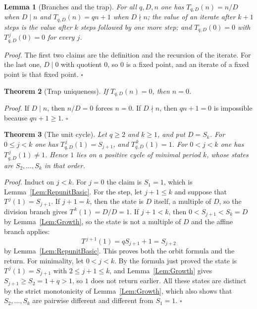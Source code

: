 \documentclass[11pt,letterpaper]{article}
\newtheorem{theorem}{Theorem}
\newtheorem{lemma}[theorem]{Lemma}
\newenvironment{proof}{\noindent\textit{Proof.}}{\hfill\(\square\)}
\begin{document}
\begin{lemma}[Branches and the trap]\label{Lem:StepBranch}
For all \(q,D,n\) one has \(T_{q,D}(n)=n/D\) when \(D\mid n\) and
\(T_{q,D}(n)=qn+1\) when \(D\nmid n\); the value of an iterate after \(k+1\)
steps is the value after \(k\) steps followed by one more step; and
\(T_{q,D}(0)=0\) with \(T_{q,D}^{\,j}(0)=0\) for every \(j\).
\end{lemma}

\begin{proof}
The first two claims are the definition and the recursion of the iterate. For
the last one, \(D\mid0\) with quotient \(0\), so \(0\) is a fixed point, and
an iterate of a fixed point is that fixed point.
\end{proof}

\begin{theorem}[Trap uniqueness]\label{Thm:Trap}
If \(T_{q,D}(n)=0\), then \(n=0\).
\end{theorem}

\begin{proof}
If \(D\mid n\), then \(n/D=0\) forces \(n=0\). If \(D\nmid n\), then
\(qn+1=0\) is impossible because \(qn+1\ge1\).
\end{proof}

\begin{theorem}[The unit cycle]\label{Thm:Cycle}
Let \(q\ge2\) and \(k\ge1\), and put \(D=S_k\). For \(0\le j<k\) one has
\(T_{q,D}^{\,j}(1)=S_{j+1}\), and \(T_{q,D}^{\,k}(1)=1\). For
\(0<j<k\) one has \(T_{q,D}^{\,j}(1)\neq1\). Hence \(1\) lies on a positive
cycle of minimal period \(k\), whose states are \(S_2,\dots,S_k\) in that
order.
\end{theorem}

\begin{proof}
Induct on \(j<k\). For \(j=0\) the claim is \(S_1=1\), which is
Lemma~\ref{Lem:RepunitBasic}. For the step, let \(j+1\le k\) and suppose that
\(T^{\,j}(1)=S_{j+1}\). If \(j+1=k\), then the state is \(D\) itself, a
multiple of \(D\), so the division branch gives \(T^{\,k}(1)=D/D=1\). If
\(j+1<k\), then \(0<S_{j+1}<S_k=D\) by Lemma~\ref{Lem:Growth}, so the state is
not a multiple of \(D\) and the affine branch applies:
\[
T^{\,j+1}(1)=qS_{j+1}+1=S_{j+2}
\]
by Lemma~\ref{Lem:RepunitBasic}. This proves both the orbit formula and the
return. For minimality, let \(0<j<k\). By the formula just proved the state is
\(T^{\,j}(1)=S_{j+1}\) with \(2\le j+1\le k\), and Lemma~\ref{Lem:Growth}
gives \(S_{j+1}\ge S_2=1+q>1\), so \(1\) does not return earlier. All these
states are distinct by the strict monotonicity of Lemma~\ref{Lem:Growth},
which also shows that \(S_2,\dots,S_k\) are pairwise different and different
from \(S_1=1\).
\end{proof}
\end{document}

